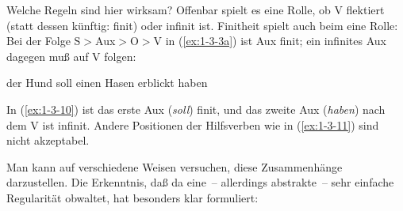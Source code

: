 \documentclass[output=paper]{langsci/langscibook}
\begin{document}
\ssubsubsection{}%
\label{subsubsec:1-3.1.2}

Welche Regeln sind hier wirksam? Offenbar spielt es eine Rolle, ob V flektiert
(statt dessen künftig: finit) oder infinit ist. Finitheit spielt auch beim  eine
Rolle: Bei der Folge S$>$Aux$>$O$>$V in (\ref{ex:1-3-3a}) ist Aux finit; ein infinites Aux dagegen muß
auf V folgen:
\begin{exe}
\ex\label{ex:1-3-10}
der Hund soll einen Hasen erblickt haben

\ex
\label{ex:1-3-11}
\begin{xlist}
\end{xlist}
\end{exe}
In (\ref{ex:1-3-10}) ist das erste Aux (\emph{soll}) finit, und das zweite Aux (\emph{haben}) nach dem V ist infinit. Andere Positionen der Hilfsverben wie in (\ref{ex:1-3-11}) sind nicht akzeptabel.

\addlines[2]
Man kann auf verschiedene Weisen versuchen, diese Zusammenhänge darzustellen. Die Erkenntnis, daß da eine~-- allerdings abstrakte~-- sehr einfache Regularität obwaltet, hat \citet{Herling1821T} besonders klar formuliert:
\end{document}
